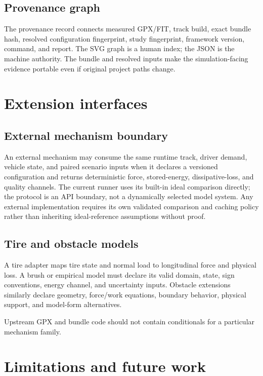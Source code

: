 \documentclass[11pt,oneside]{report}
\begin{document}
\section{Provenance graph}

The provenance record connects measured GPX/FIT, track build, exact bundle hash, resolved
configuration fingerprint, study fingerprint, framework version, command, and report.
The SVG graph is a human index; the JSON is the machine authority.  The bundle and
resolved inputs make the simulation-facing evidence portable even if original project
paths change.

\chapter{Extension interfaces}\label{sec:extensions}

\section{External mechanism boundary}

An external mechanism may consume the same runtime track, driver demand, vehicle state,
and paired scenario inputs when it declares a versioned configuration and returns
deterministic force, stored-energy, dissipative-loss, and quality channels.  The current
runner uses its built-in ideal comparison directly; the protocol is an API boundary, not
a dynamically selected model system.  Any external implementation requires its own
validated comparison and caching policy rather than inheriting ideal-reference
assumptions without proof.

\section{Tire and obstacle models}

A tire adapter maps tire state and normal load to longitudinal force and physical loss.
A brush or empirical model must declare its valid domain, state, sign conventions,
energy channel, and uncertainty inputs.  Obstacle extensions similarly declare geometry,
force/work equations, boundary behavior, physical support, and model-form alternatives.

Upstream GPX and bundle code should not contain conditionals for a particular mechanism
family.

\chapter{Limitations and future work}\label{ch:limitations}
\end{document}
